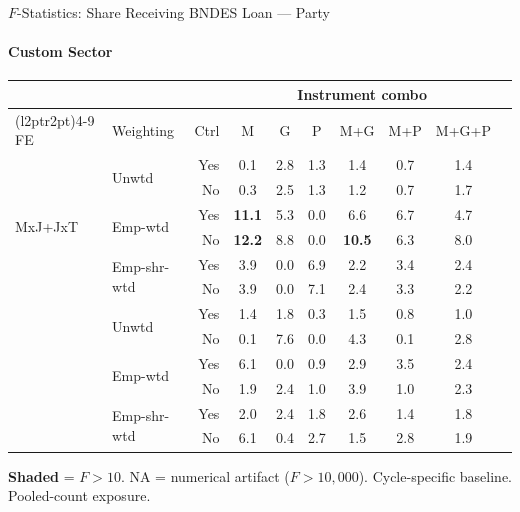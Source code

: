 \documentclass[aspectratio=169,10pt]{beamer}
\newcommand{\fpass}[1]{\cellcolor{pass}\textbf{#1}}
\begin{document}
\begin{frame}[t]{$F$-Statistics: Share Receiving BNDES Loan --- Party}
\framesubtitle{Custom Sector}
\begin{center}
\footnotesize
\setlength{\tabcolsep}{3.5pt}
\renewcommand{\arraystretch}{1.05}
\begin{tabular}{@{}llrccccccc@{}}
\toprule
 & & & \multicolumn{6}{c}{Instrument combo} \\
\cmidrule(l{2pt}r{2pt}){4-9}
FE & Weighting & Ctrl & M & G & P & M+G & M+P & M+G+P \\
\midrule
  \multirow{6}{*}{MxJ+JxT} & \multirow{2}{*}{Unwtd} & Yes & 0.1 & 2.8 & 1.3 & 1.4 & 0.7 & 1.4 \\
   &  & No & 0.3 & 2.5 & 1.3 & 1.2 & 0.7 & 1.7 \\
   & \multirow{2}{*}{Emp-wtd} & Yes & \fpass{11.1} & 5.3 & 0.0 & 6.6 & 6.7 & 4.7 \\
   &  & No & \fpass{12.2} & 8.8 & 0.0 & \fpass{10.5} & 6.3 & 8.0 \\
   & \multirow{2}{*}{Emp-shr-wtd} & Yes & 3.9 & 0.0 & 6.9 & 2.2 & 3.4 & 2.4 \\
   &  & No & 3.9 & 0.0 & 7.1 & 2.4 & 3.3 & 2.2 \\
\addlinespace[5pt]
  \multirow{6}{*}{MxJ+MxT} & \multirow{2}{*}{Unwtd} & Yes & 1.4 & 1.8 & 0.3 & 1.5 & 0.8 & 1.0 \\
   &  & No & 0.1 & 7.6 & 0.0 & 4.3 & 0.1 & 2.8 \\
   & \multirow{2}{*}{Emp-wtd} & Yes & 6.1 & 0.0 & 0.9 & 2.9 & 3.5 & 2.4 \\
   &  & No & 1.9 & 2.4 & 1.0 & 3.9 & 1.0 & 2.3 \\
   & \multirow{2}{*}{Emp-shr-wtd} & Yes & 2.0 & 2.4 & 1.8 & 2.6 & 1.4 & 1.8 \\
   &  & No & 6.1 & 0.4 & 2.7 & 1.5 & 2.8 & 1.9 \\
\bottomrule
\end{tabular}
\end{center}
{\scriptsize \colorbox{pass}{\textbf{Shaded}} = $F>10$. NA = numerical artifact ($F>10{,}000$). Cycle-specific baseline. Pooled-count exposure.}
\end{frame}
\end{document}

